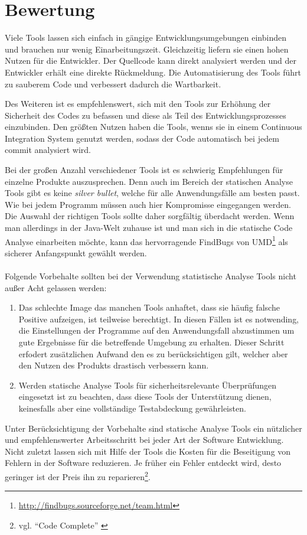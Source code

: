 \section{Bewertung}
Viele Tools lassen sich einfach in gängige Entwicklungsumgebungen einbinden und brauchen nur wenig Einarbeitungszeit. Gleichzeitig liefern sie einen hohen Nutzen für die Entwickler. Der Quellcode kann direkt analysiert werden und der Entwickler erhält eine direkte Rückmeldung. Die Automatisierung des Tools führt zu sauberem Code und verbessert dadurch die Wartbarkeit.

Des Weiteren ist es empfehlenswert, sich mit den Tools zur Erhöhung der Sicherheit des Codes zu befassen und diese als Teil des Entwicklungsprozesses einzubinden. Den größten Nutzen haben die Tools, wenns sie in einem Continuous Integration System genutzt werden, sodass der Code automatisch bei jedem commit analysiert wird.

Bei der großen Anzahl verschiedener Tools ist es schwierig Empfehlungen für einzelne Produkte auszusprechen. Denn auch im Bereich der statischen Analyse Tools gibt es keine \emph{silver bullet}, welche für alle Anwendungsfälle am besten passt. Wie bei jedem Programm müssen auch hier Kompromisse eingegangen werden. Die Auswahl der richtigen Tools sollte daher sorgfältig überdacht werden. Wenn man allerdings in der Java-Welt zuhause ist und man sich in die statische Code Analyse einarbeiten möchte, kann das hervorragende FindBugs von UMD\footnote{\url{http://findbugs.sourceforge.net/team.html}} als sicherer Anfangspunkt gewählt werden.
\\\\
Folgende Vorbehalte sollten bei der Verwendung statistische Analyse Tools nicht außer Acht gelassen werden:
\begin{enumerate}
  \item Das schlechte Image das manchen Tools anhaftet, dass sie häufig falsche Positive aufzeigen, ist teilweise berechtigt. In diesen Fällen ist es notwending, die Einstellungen der Programme auf den Anwendungsfall abzustimmen um gute Ergebnisse für die betreffende Umgebung zu erhalten. Dieser Schritt erfodert zusätzlichen Aufwand den es zu berücksichtigen gilt, welcher aber den Nutzen des Produkts drastisch verbessern kann.
  \item Werden statische Analyse Tools für sicherheitsrelevante Überprüfungen eingesetzt ist zu beachten, dass diese Tools der Unterstützung dienen, keinesfalls aber eine vollständige Testabdeckung gewährleisten.
\end{enumerate}

Unter Berücksichtigung der Vorbehalte sind statische Analyse Tools ein nützlicher und empfehlenswerter Arbeitsschritt bei jeder  Art der Software Entwicklung. Nicht zuletzt lassen sich mit Hilfe der Tools die Kosten für die Beseitigung von Fehlern in der Software reduzieren. Je früher ein Fehler entdeckt wird, desto geringer ist der Preis ihn zu reparieren\footnote{vgl. ``Code Complete'' \citep{mcconnell2004}}.
